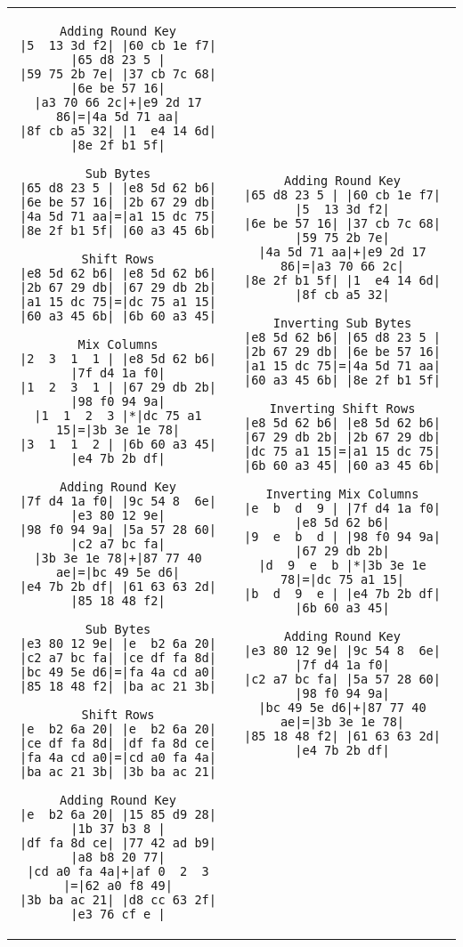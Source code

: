 \documentclass{article}
\begin{document}
\noindent\begin{tabular}{@{}c@{ }c@{}}
\noindent\begin{lstlisting}
Adding Round Key
|5  13 3d f2| |60 cb 1e f7| |65 d8 23 5 |
|59 75 2b 7e| |37 cb 7c 68| |6e be 57 16|
|a3 70 66 2c|+|e9 2d 17 86|=|4a 5d 71 aa|
|8f cb a5 32| |1  e4 14 6d| |8e 2f b1 5f|

Sub Bytes
|65 d8 23 5 | |e8 5d 62 b6|
|6e be 57 16| |2b 67 29 db|
|4a 5d 71 aa|=|a1 15 dc 75|
|8e 2f b1 5f| |60 a3 45 6b|

Shift Rows
|e8 5d 62 b6| |e8 5d 62 b6|
|2b 67 29 db| |67 29 db 2b|
|a1 15 dc 75|=|dc 75 a1 15|
|60 a3 45 6b| |6b 60 a3 45|

Mix Columns
|2  3  1  1 | |e8 5d 62 b6| |7f d4 1a f0|
|1  2  3  1 | |67 29 db 2b| |98 f0 94 9a|
|1  1  2  3 |*|dc 75 a1 15|=|3b 3e 1e 78|
|3  1  1  2 | |6b 60 a3 45| |e4 7b 2b df|

Adding Round Key
|7f d4 1a f0| |9c 54 8  6e| |e3 80 12 9e|
|98 f0 94 9a| |5a 57 28 60| |c2 a7 bc fa|
|3b 3e 1e 78|+|87 77 40 ae|=|bc 49 5e d6|
|e4 7b 2b df| |61 63 63 2d| |85 18 48 f2|

Sub Bytes
|e3 80 12 9e| |e  b2 6a 20|
|c2 a7 bc fa| |ce df fa 8d|
|bc 49 5e d6|=|fa 4a cd a0|
|85 18 48 f2| |ba ac 21 3b|

Shift Rows
|e  b2 6a 20| |e  b2 6a 20|
|ce df fa 8d| |df fa 8d ce|
|fa 4a cd a0|=|cd a0 fa 4a|
|ba ac 21 3b| |3b ba ac 21|

Adding Round Key
|e  b2 6a 20| |15 85 d9 28| |1b 37 b3 8 |
|df fa 8d ce| |77 42 ad b9| |a8 b8 20 77|
|cd a0 fa 4a|+|af 0  2  3 |=|62 a0 f8 49|
|3b ba ac 21| |d8 cc 63 2f| |e3 76 cf e |
\end{lstlisting} &
\noindent\begin{lstlisting}
Adding Round Key
|65 d8 23 5 | |60 cb 1e f7| |5  13 3d f2|
|6e be 57 16| |37 cb 7c 68| |59 75 2b 7e|
|4a 5d 71 aa|+|e9 2d 17 86|=|a3 70 66 2c|
|8e 2f b1 5f| |1  e4 14 6d| |8f cb a5 32|

Inverting Sub Bytes
|e8 5d 62 b6| |65 d8 23 5 |
|2b 67 29 db| |6e be 57 16|
|a1 15 dc 75|=|4a 5d 71 aa|
|60 a3 45 6b| |8e 2f b1 5f|

Inverting Shift Rows
|e8 5d 62 b6| |e8 5d 62 b6|
|67 29 db 2b| |2b 67 29 db|
|dc 75 a1 15|=|a1 15 dc 75|
|6b 60 a3 45| |60 a3 45 6b|

Inverting Mix Columns
|e  b  d  9 | |7f d4 1a f0| |e8 5d 62 b6|
|9  e  b  d | |98 f0 94 9a| |67 29 db 2b|
|d  9  e  b |*|3b 3e 1e 78|=|dc 75 a1 15|
|b  d  9  e | |e4 7b 2b df| |6b 60 a3 45|

Adding Round Key
|e3 80 12 9e| |9c 54 8  6e| |7f d4 1a f0|
|c2 a7 bc fa| |5a 57 28 60| |98 f0 94 9a|
|bc 49 5e d6|+|87 77 40 ae|=|3b 3e 1e 78|
|85 18 48 f2| |61 63 63 2d| |e4 7b 2b df|


\end{lstlisting}
\end{tabular}
\end{document}
